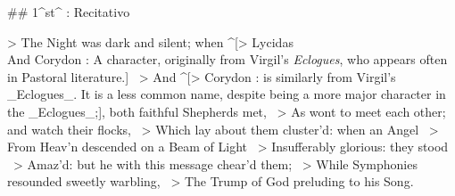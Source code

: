 ## 1^st^ \mvmt: Recitativo


> The Night was dark and silent; when ^[> Lycidas \\ And Corydon : A character, originally from Virgil's \textit{Eclogues}, who appears often in Pastoral literature.] \
> And ^[> Corydon : is similarly from Virgil's _Eclogues_. It is a less common name, despite being a more major character in the _Eclogues_;], both faithful Shepherds met,  \
> As wont to meet each other; and watch their flocks,  \
> Which lay about them cluster’d: when an Angel  \
> From Heav’n descended on a Beam of Light  \
> Insufferably glorious: they stood  \
> Amaz’d: but he with this message chear’d them;  \
> While Symphonies resounded sweetly warbling,  \
> The Trump of God preluding to his Song.

